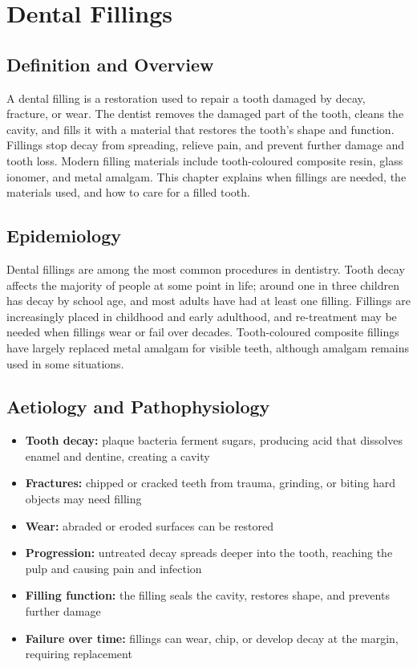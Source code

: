 \chapter{Dental Fillings}

\section*{Definition and Overview}
A dental filling is a restoration used to repair a tooth damaged by decay, fracture, or wear. The dentist removes the damaged part of the tooth, cleans the cavity, and fills it with a material that restores the tooth's shape and function. Fillings stop decay from spreading, relieve pain, and prevent further damage and tooth loss. Modern filling materials include tooth-coloured composite resin, glass ionomer, and metal amalgam. This chapter explains when fillings are needed, the materials used, and how to care for a filled tooth.

\section*{Epidemiology}
Dental fillings are among the most common procedures in dentistry. Tooth decay affects the majority of people at some point in life; around one in three children has decay by school age, and most adults have had at least one filling. Fillings are increasingly placed in childhood and early adulthood, and re-treatment may be needed when fillings wear or fail over decades. Tooth-coloured composite fillings have largely replaced metal amalgam for visible teeth, although amalgam remains used in some situations.

\section*{Aetiology and Pathophysiology}
\begin{itemize}
    \item \textbf{Tooth decay:} plaque bacteria ferment sugars, producing acid that dissolves enamel and dentine, creating a cavity
    \item \textbf{Fractures:} chipped or cracked teeth from trauma, grinding, or biting hard objects may need filling
    \item \textbf{Wear:} abraded or eroded surfaces can be restored
    \item \textbf{Progression:} untreated decay spreads deeper into the tooth, reaching the pulp and causing pain and infection
    \item \textbf{Filling function:} the filling seals the cavity, restores shape, and prevents further damage
    \item \textbf{Failure over time:} fillings can wear, chip, or develop decay at the margin, requiring replacement
\end{itemize}

